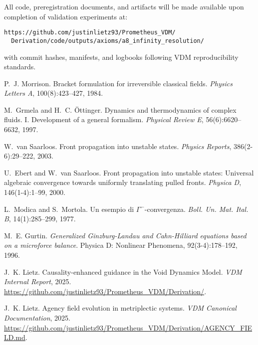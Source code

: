 \documentclass{article}
\begin{document}
All code, preregistration documents, and artifacts will be made available upon completion of validation experiments at:
\begin{verbatim}
https://github.com/justinlietz93/Prometheus_VDM/
  Derivation/code/outputs/axioms/a8_infinity_resolution/
\end{verbatim}
with commit hashes, manifests, and logbooks following VDM reproducibility standards.


\begin{thebibliography}{10}

P.~J. Morrison.
\newblock Bracket formulation for irreversible classical fields.
\newblock \emph{Physics Letters A}, 100(8):423--427, 1984.

M.~Grmela and H.~C. {\"O}ttinger.
\newblock Dynamics and thermodynamics of complex fluids. {I}. Development of a general formalism.
\newblock \emph{Physical Review E}, 56(6):6620--6632, 1997.

W.~van Saarloos.
\newblock Front propagation into unstable states.
\newblock \emph{Physics Reports}, 386(2-6):29--222, 2003.

U.~Ebert and W.~van Saarloos.
\newblock Front propagation into unstable states: Universal algebraic convergence towards uniformly translating pulled fronts.
\newblock \emph{Physica D}, 146(1-4):1--99, 2000.

L.~Modica and S.~Mortola.
\newblock Un esempio di $\Gamma^-$-convergenza.
\newblock \emph{Boll. Un. Mat. Ital. B}, 14(1):285--299, 1977.

M.~E. Gurtin.
\newblock \emph{Generalized Ginzburg-Landau and Cahn-Hilliard equations based on a microforce balance}.
\newblock Physica D: Nonlinear Phenomena, 92(3-4):178--192, 1996.

J.~K. Lietz.
\newblock Causality-enhanced guidance in the Void Dynamics Model.
\newblock \emph{VDM Internal Report}, 2025.
\newblock \url{https://github.com/justinlietz93/Prometheus_VDM/Derivation/}.

J.~K. Lietz.
\newblock Agency field evolution in metriplectic systems.
\newblock \emph{VDM Canonical Documentation}, 2025.
\newblock \url{https://github.com/justinlietz93/Prometheus_VDM/Derivation/AGENCY_FIELD.md}.

\end{thebibliography}
\end{document}
